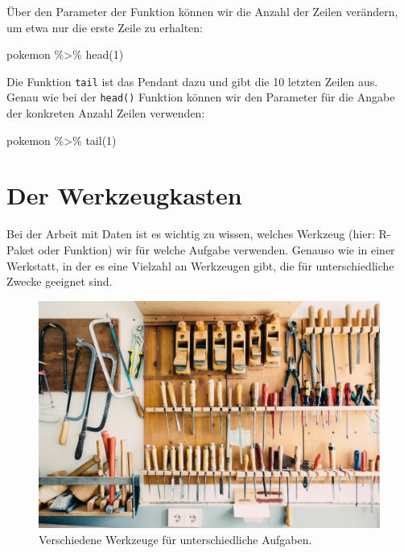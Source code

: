 \documentclass[
]{book}
\newenvironment{Shaded}{\begin{snugshade}}{\end{snugshade}}
\newcommand{\DecValTok}[1]{\textcolor[rgb]{0.00,0.00,0.81}{#1}}
\newcommand{\FunctionTok}[1]{\textcolor[rgb]{0.00,0.00,0.00}{#1}}
\newcommand{\NormalTok}[1]{#1}
\newcommand{\SpecialCharTok}[1]{\textcolor[rgb]{0.00,0.00,0.00}{#1}}
\begin{document}
Über den Parameter der Funktion können wir die Anzahl der Zeilen verändern, um etwa nur die erste Zeile zu erhalten:

\begin{Shaded}
\begin{Highlighting}[]
\NormalTok{pokemon }\SpecialCharTok{\%\textgreater{}\%} 
  \FunctionTok{head}\NormalTok{(}\DecValTok{1}\NormalTok{)}
\end{Highlighting}
\end{Shaded}

Die Funktion \texttt{tail} ist das Pendant dazu und gibt die 10 letzten Zeilen aus. Genau wie bei der \texttt{head()} Funktion können wir den Parameter für die Angabe der konkreten Anzahl Zeilen verwenden:

\begin{Shaded}
\begin{Highlighting}[]
\NormalTok{pokemon }\SpecialCharTok{\%\textgreater{}\%}
  \FunctionTok{tail}\NormalTok{(}\DecValTok{1}\NormalTok{)}
\end{Highlighting}
\end{Shaded}

\hypertarget{der-werkzeugkasten}{%
\chapter{Der Werkzeugkasten}\label{der-werkzeugkasten}}

Bei der Arbeit mit Daten ist es wichtig zu wissen, welches Werkzeug (hier: R-Paket oder Funktion) wir für welche Aufgabe verwenden. Genauso wie in einer Werkstatt, in der es eine Vielzahl an Werkzeugen gibt, die für unterschiedliche Zwecke geeignet sind.

\begin{figure}
\includegraphics[width=1\linewidth]{fig/tool_set} \caption{Verschiedene Werkzeuge für unterschiedliche Aufgaben.}\label{fig:fig-werkzeuge}
\end{figure}
\end{document}
